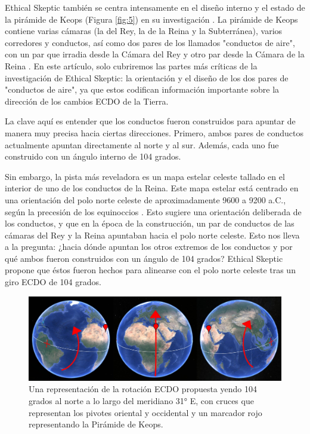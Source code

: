 \documentclass[10pt,twocolumn,letterpaper]{article}
\begin{document}
Ethical Skeptic también se centra intensamente en el diseño interno y el estado de la pirámide de Keops (Figura \ref{fig:5}) en su investigación \cite{28}. La pirámide de Keops contiene varias cámaras (la del Rey, la de la Reina y la Subterránea), varios corredores y conductos, así como dos pares de los llamados "conductos de aire", con un par que irradia desde la Cámara del Rey y otro par desde la Cámara de la Reina \cite{29,30}. En este artículo, solo cubriremos las partes más críticas de la investigación de Ethical Skeptic: la orientación y el diseño de los dos pares de "conductos de aire", ya que estos codifican información importante sobre la dirección de los cambios ECDO de la Tierra.

La clave aquí es entender que los conductos fueron construidos para apuntar de manera muy precisa hacia ciertas direcciones. Primero, ambos pares de conductos actualmente apuntan directamente al norte y al sur. Además, cada uno fue construido con un ángulo interno de 104 grados.

Sin embargo, la pista más reveladora es un mapa estelar celeste tallado en el interior de uno de los conductos de la Reina. Este mapa estelar está centrado en una orientación del polo norte celeste de aproximadamente 9600 a 9200 a.C., según la precesión de los equinoccios \cite{28}. Esto sugiere una orientación deliberada de los conductos, y que en la época de la construcción, un par de conductos de las cámaras del Rey y la Reina apuntaban hacia el polo norte celeste. Esto nos lleva a la pregunta: ¿hacia dónde apuntan los otros extremos de los conductos y por qué ambos fueron construidos con un ángulo de 104 grados? Ethical Skeptic propone que éstos fueron hechos para alinearse con el polo norte celeste tras un giro ECDO de 104 grados.

\begin{figure}[t]
\begin{center}
\includegraphics[width=1\textwidth]{drawing.jpg}
\end{center}
   \caption{Una representación de la rotación ECDO propuesta yendo 104 grados al norte a lo largo del meridiano 31° E, con cruces que representan los pivotes oriental y occidental y un marcador rojo representando la Pirámide de Keops.}
\label{fig:6}
\end{figure}
\end{document}
